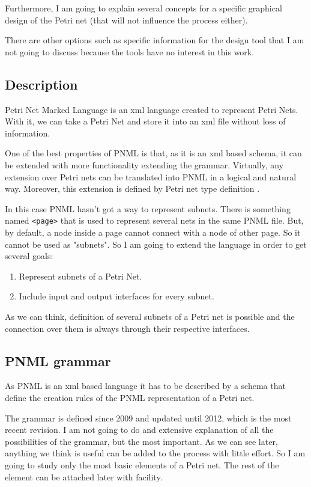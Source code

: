Furthermore, I am going to explain several concepts for a specific graphical
design of the Petri net (that will not influence the process either).

There are other options such as specific information for the design tool
that I am not going to discuss because the tools have no interest in this work. 

\subsection{Description}
Petri Net Marked Language is an xml language created to represent Petri Nets. With it, we can take a Petri Net and store it into an xml file without loss of information.

One of the best properties of PNML is that, as it is an xml based schema,
it can be extended with more functionality extending the grammar.
Virtually, any extension over Petri nets can be translated into PNML in a logical and natural way.
Moreover, this extension is defined by Petri net type definition \cite{PNML-Billington2003483,PNML-iso/iec-15909-2:2011}.
 

In this case PNML hasn't got a way to represent subnets. There is something named \texttt{<page>} 
that is used to represent several nets in the same PNML file. But, by default,
a node inside a page cannot connect with a node of other page. So it cannot
be used as "subnets". So I am going to extend the language in order to get several goals:
\begin{enumerate}
\item Represent subnets of a Petri Net.
\item Include input and output interfaces for every subnet.
\end{enumerate}

As we can think, definition of several subnets of a Petri net is possible
and the connection over them is always through their respective interfaces.

\subsection{PNML grammar}

As PNML is an xml based language it has to be described by a schema that define the creation rules of the PNML representation of a Petri net.

The grammar is defined since 2009 and updated until
2012, which is the most recent revision.
I am not going to do and extensive explanation of all the possibilities
of the grammar, but the most important. As we can see later, anything we think is useful can be added to the process with little effort.
So I am going to study only the most basic elements of a Petri net. The rest of the element can be attached later with facility. 

